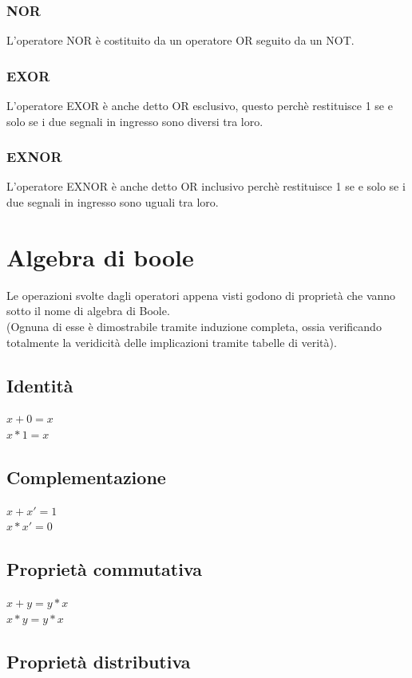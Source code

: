 \documentclass[a4paper]{book}
\begin{document}
\subsubsection*{NOR}

L'operatore NOR è costituito da un operatore OR seguito da un NOT.

\subsubsection*{EXOR}
L'operatore EXOR è anche detto OR esclusivo, questo perchè restituisce 1 se e solo se i due segnali in ingresso sono diversi tra loro.
\subsubsection*{EXNOR}
L'operatore EXNOR è anche detto OR inclusivo perchè restituisce 1 se e solo se i due segnali in ingresso sono uguali tra loro.

\newpage
\section{Algebra di boole}
Le operazioni svolte dagli operatori appena visti godono di proprietà che vanno sotto il nome di algebra di Boole.\\ (Ognuna di esse è dimostrabile tramite induzione completa, ossia verificando totalmente la veridicità delle implicazioni tramite tabelle di verità).

\subsection*{Identità}

\(x+0=x \) \\
\(x*1=x \)

\subsection*{Complementazione}

\(x+x'=1 \) \\
\(x*x'=0 \)

\subsection*{Proprietà commutativa}

\(x+y=y*x \) \\
\(x*y=y*x \) 

\subsection*{Proprietà distributiva}
\end{document}
